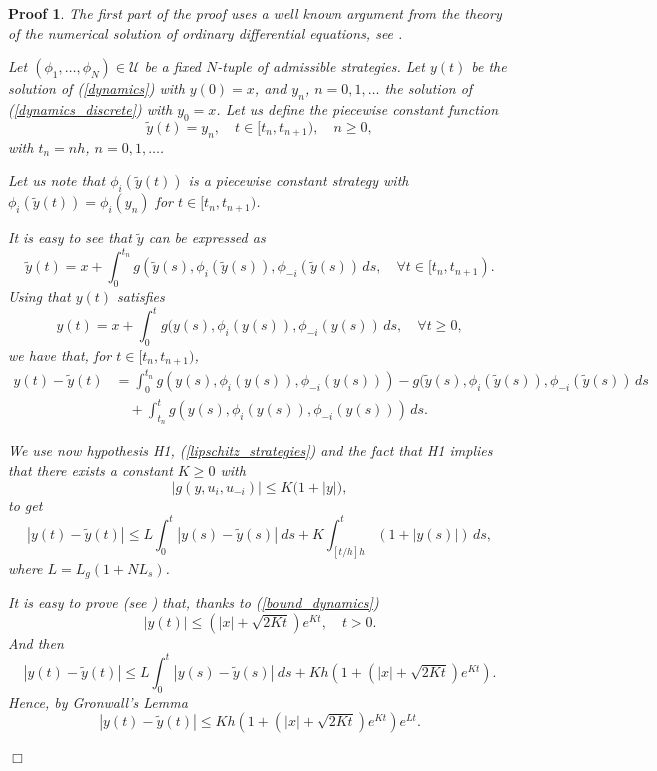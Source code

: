 \documentclass[12pt]{article}
\newtheorem{Proof}{Proof}
\newenvironment{proof}{\begin{Proof}\rm}{\hfill $\Box$ \end{Proof}}
\begin{document}
\begin{proof} The first part of the proof uses a well known argument from the theory of the numerical solution of ordinary differential equations, see \cite[Chapter 6, Lemma 1.2]{Bardi} .

Let $(\phi_1,\dots,\phi_N)\in\mathcal{U}$ be a fixed $N$-tuple of admissible strategies.
Let $y(t)$ be the solution of (\ref{dynamics}) with $y(0)=x$,
and $y_n$, $n=0,1,\dots$ the solution of (\ref{dynamics_discrete}) with $y_0=x$. Let us define the piecewise constant function
$$\tilde{y}(t)=y_n,\quad t\in [t_n, t_{n+1}), \quad n\ge 0,$$
with $t_n=nh$, $n=0,1,\dots$.

Let us note that $\phi_i(\tilde{y}(t))$ is a piecewise constant strategy with $\phi_i(\tilde{y}(t))=\phi_i(y_n)$ for $t\in [t_n, t_{n+1})$.

It is easy to see that $\tilde{y}$ can be expressed as
$$
\tilde{y}(t)=x+\int_0^{t_n}g(\tilde{y}(s),\phi_i(\tilde{y}(s)),\phi_{-i}(\tilde{y}(s))\,ds,
\quad \forall t\in[t_n, t_{n+1}).
$$
Using that $y(t)$ satisfies
$$
{y}(t)=x+\int_0^{t}g({y}(s),\phi_i(y(s)),\phi_{-i}(y(s))\, ds, \quad  \forall t\ge 0,
$$
we have that, for $t\in[t_n,t_{n+1})$,
\begin{align}\label{eq_prime_pro}
y(t)-\tilde y(t)&= \int_0^{t_n}g(y(s),\phi_i(y(s)),\phi_{-i}(y(s)))
-g(\tilde y(s),\phi_i(\tilde{y}(s)),\phi_{-i}(\tilde{y}(s))\, ds\nonumber\\
&\quad+\int_{t_n}^t g(y(s),\phi_i(y(s)),\phi_{-i}(y(s))) \, ds.
\end{align}

 We use now hypothesis H1, (\ref{lipschitz_strategies})  and the fact that H1 implies that there exists a constant
 $K\ge 0$ with
\begin{equation}\label{bound_dynamics}
|g(y,u_{i},u_{-i})|\le K\big(1+|y|\bigr),
\end{equation}
to get
\begin{equation*}
|y(t)-\tilde y(t)|\le  L\int_0^t |y(s)-\tilde y(s)|~ds+K\int_{[t/h]h}^t(1+|y(s)|) \, ds,
\end{equation*}
where $ L=L_g(1+NL_s)$.

It is easy to prove (see \cite[Chapter 3, Theorem 5.5]{Bardi}) that, thanks to (\ref{bound_dynamics})
\begin{equation}\label{eq:cota_sol_or}
|y(t)|\le (|x|+\sqrt{2Kt})e^{K t},\quad t>0.
\end{equation}
And then
\begin{equation*}
|y(t)-\tilde y(t)|\le   L\int_0^t |y(s)-\tilde y(s)|~ds+K h\left(1+(|x|+\sqrt{2Kt})e^{Kt}\right).
\end{equation*}
Hence, by Gronwall's Lemma
\begin{equation}\label{estimacion_dynamics}
|y(t)-\tilde y(t)|\le K h\left(1+(|x|+\sqrt{2Kt})e^{Kt}\right)e^{Lt}.
\end{equation}


\end{proof}
\end{document}

